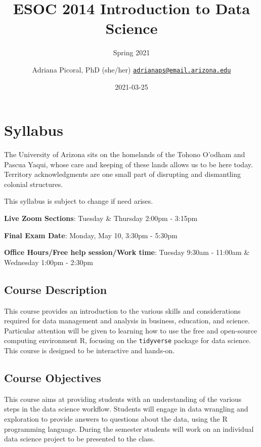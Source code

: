 \documentclass[
]{book}
\title{ESOC 2014 Introduction to Data Science}
\subtitle{Spring 2021}
\author{Adriana Picoral, PhD (she/her) \href{mailto:adrianaps@email.arizona.edu}{\nolinkurl{adrianaps@email.arizona.edu}}}
\date{2021-03-25}
\begin{document}
\maketitle

{
\setcounter{tocdepth}{1}
\tableofcontents
}
\hypertarget{syllabus}{%
\chapter{Syllabus}\label{syllabus}}

The University of Arizona sits on the homelands of the Tohono O'odham and Pascua Yaqui, whose care and keeping of these lands allows us to be here today. Territory acknowledgments are one small part of disrupting and dismantling colonial structures.

This syllabus is subject to change if need arises.

\textbf{Live Zoom Sections}: Tuesday \& Thursday 2:00pm - 3:15pm

\textbf{Final Exam Date}: Monday, May 10, 3:30pm - 5:30pm

\textbf{Office Hours/Free help session/Work time}: Tuesday 9:30am - 11:00am \& Wednesday 1:00pm - 2:30pm

\hypertarget{course-description}{%
\section{Course Description}\label{course-description}}

This course provides an introduction to the various skills and considerations required for data management and analysis in business, education, and science. Particular attention will be given to learning how to use the free and open-source computing environment R, focusing on the \texttt{tidyverse} package for data science. This course is designed to be interactive and hands-on.

\hypertarget{course-objectives}{%
\section{Course Objectives}\label{course-objectives}}

This course aims at providing students with an understanding of the various steps in the data science workflow. Students will engage in data wrangling and exploration to provide answers to questions about the data, using the R programming language. During the semester students will work on an individual data science project to be presented to the class.
\end{document}
